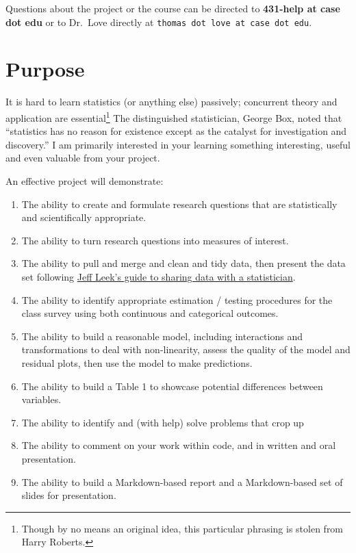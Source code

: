 \documentclass[]{book}
\providecommand{\tightlist}{%
  \setlength{\itemsep}{0pt}\setlength{\parskip}{0pt}}
\let\rmarkdownfootnote\footnote%
\def\footnote{\protect\rmarkdownfootnote}
\theoremstyle{definition}
\theoremstyle{definition}
\theoremstyle{definition}
\theoremstyle{remark}
\begin{document}
Questions about the project or the course can be directed to
\textbf{431-help at case dot edu} or to Dr.~Love directly at
\texttt{thomas\ dot\ love\ at\ case\ dot\ edu}.

\hypertarget{purpose}{%
\chapter{Purpose}\label{purpose}}

It is hard to learn statistics (or anything else) passively; concurrent
theory and application are
essential\footnote{Though by no means an original idea, this particular phrasing is stolen from Harry Roberts.}
The distinguished statistician, George Box, noted that ``statistics has
no reason for existence except as the catalyst for investigation and
discovery.'' I am primarily interested in your learning something
interesting, useful and even valuable from your project.

An effective project will demonstrate:

\begin{enumerate}
\def\labelenumi{\arabic{enumi}.}
\tightlist
\item
  The ability to create and formulate research questions that are
  statistically and scientifically appropriate.
\item
  The ability to turn research questions into measures of interest.
\item
  The ability to pull and merge and clean and tidy data, then present
  the data set following
  \href{https://github.com/jtleek/datasharing}{Jeff Leek's guide to
  sharing data with a statistician}.
\item
  The ability to identify appropriate estimation / testing procedures
  for the class survey using both continuous and categorical outcomes.
\item
  The ability to build a reasonable model, including interactions and
  transformations to deal with non-linearity, assess the quality of the
  model and residual plots, then use the model to make predictions.
\item
  The ability to build a Table 1 to showcase potential differences
  between variables.
\item
  The ability to identify and (with help) solve problems that crop up
\item
  The ability to comment on your work within code, and in written and
  oral presentation.
\item
  The ability to build a Markdown-based report and a Markdown-based set
  of slides for presentation.
\end{enumerate}
\end{document}
